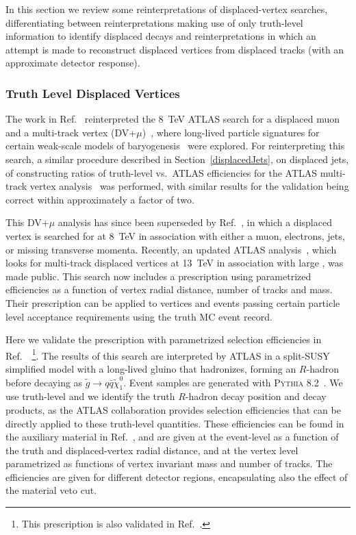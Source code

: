 In this section we review some reinterpretations of displaced-vertex searches, differentiating between reinterpretations making use of only truth-level information to identify displaced decays and reinterpretations in which an attempt is made to reconstruct displaced vertices from displaced tracks (with an approximate detector response).

\subsubsection{Truth Level Displaced Vertices}

The work in Ref.~\cite{Cui:2014twa} reinterpreted the 8~TeV ATLAS search for a displaced muon and a multi-track vertex (DV+$\mu$)~\cite{ATLAS-CONF-2013-092}, where long-lived particle signatures for certain weak-scale models of baryogenesis~\cite{Cui:2012jh,Cui:2013bta,Cui:2014twa} were explored. For reinterpreting this search, a similar procedure described in Section~\ref{displacedJets}, on displaced jets, of constructing ratios of truth-level vs.~ATLAS efficiencies for the ATLAS multi-track vertex analysis~\cite{ATLAS-CONF-2013-092} was performed, with similar results for the validation being correct within approximately a factor of two.

This DV+$\mu$ analysis has since been superseded by Ref.~\cite{Aad:2015rba}, in which a displaced vertex is searched for at 8~TeV in association with either a muon, electrons, jets, or missing transverse momenta. Recently, an updated ATLAS analysis~\cite{Aaboud:2017iio}, which looks for multi-track displaced vertices at 13~TeV in association with large \met, was made public. This search now includes a prescription using parametrized efficiencies as a function of vertex radial distance, number of tracks and mass. Their prescription can be applied to vertices and events passing certain particle level acceptance requirements using the truth MC event record.

Here we validate the prescription with parametrized selection efficiencies
in Ref.~\cite{Aaboud:2017iio}~\footnote{This prescription is also validated in
Ref.~\cite{LesHouches2017}.}. The results of this search are interpreted by ATLAS in a split-SUSY simplified model with a long-lived gluino that hadronizes, forming an $R$-hadron before decaying as $\tilde{g}\rightarrow q\bar{q}\tilde{\chi}^{0}_{1}$. Event samples are generated with \textsc{Pythia 8.2}~\cite{Sjostrand:2014zea}. We use truth-level \met and we identify the truth $R$-hadron decay position and decay products, as the ATLAS collaboration provides selection efficiencies that can be directly applied to these truth-level quantities. These efficiencies can be found in the auxiliary material in Ref.~\cite{SUSY-2016-08}, and are given at the event-level as a function of the truth \met and displaced-vertex radial distance, and at the vertex level parametrized as functions of vertex invariant mass and number of tracks. The efficiencies are given for different detector regions, encapsulating also the effect of the material veto cut.

